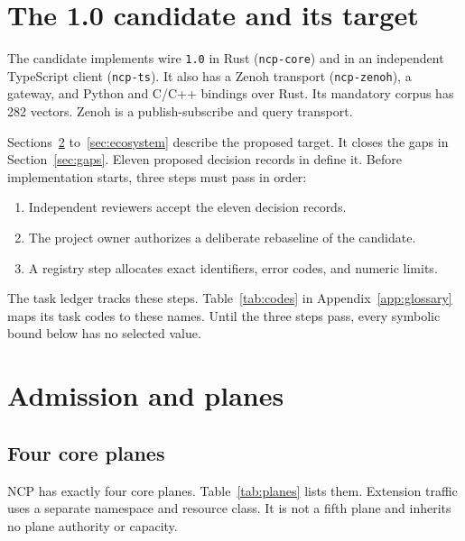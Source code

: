 \documentclass[11pt,a4paper]{article}
\theoremstyle{definition}
\let\NcpTextttBase\texttt
\renewcommand{\texttt}[1]{\mbox{\NcpTextttBase{#1}}}
\begin{document}
\section{The 1.0 candidate and its target}


The candidate implements wire \texttt{1.0} in Rust (\texttt{ncp-core}) and in an
independent TypeScript client (\texttt{ncp-ts}). It also has a Zenoh transport
(\texttt{ncp-zenoh}), a gateway, and Python and C/C++ bindings over Rust. Its mandatory corpus has 282 vectors. Zenoh
is a publish-subscribe and query transport.

Sections~\ref{sec:admission} to~\ref{sec:ecosystem} describe the proposed target. It
closes the gaps in Section~\ref{sec:gaps}. Eleven proposed decision records in
 define it. Before implementation starts, three steps must pass in
order:
\begin{enumerate}[leftmargin=*]
  \item Independent reviewers accept the eleven decision records.
  \item The project owner authorizes a deliberate rebaseline of the candidate.
  \item A registry step allocates exact identifiers, error codes, and numeric limits.
\end{enumerate}
The task ledger  tracks these
steps. Table~\ref{tab:codes} in Appendix~\ref{app:glossary} maps its task codes to
these names. Until the three steps pass, every symbolic bound below has no selected
value.

\section{Admission and planes}\label{sec:admission}


\subsection{Four core planes}

NCP has exactly four core planes. Table~\ref{tab:planes} lists them. Extension traffic
uses a separate namespace and resource class. It is not a fifth plane and inherits no
plane authority or capacity.
\end{document}
